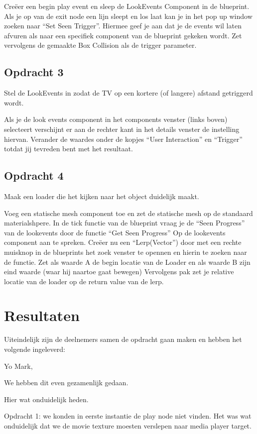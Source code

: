 Creëer een begin play event en sleep de LookEvents Component in de blueprint. Als je op van de exit node een lijn sleept en los laat kan je in het pop up window zoeken naar “Set Seen Trigger”. Hiermee geef je aan dat je de events wil laten afvuren als naar een specifiek component van de blueprint gekeken wordt. Zet vervolgens de gemaakte Box Collision als de trigger parameter.

\subsection{Opdracht 3}
Stel de LookEvents in zodat de TV op een kortere (of langere) afstand getriggerd wordt.

Als je de look events component in het components venster (links boven) selecteert verschijnt er aan de rechter kant in het details venster de instelling hiervan. 
Verander de waardes onder de kopjes “User Interaction” en “Trigger” totdat jij tevreden bent met het resultaat.

\subsection{Opdracht 4}
Maak een loader die het kijken naar het object duidelijk maakt.

Voeg een statische mesh component toe en zet de statische mesh op de standaard materialshpere.
In de tick functie van de blueprint vraag je de “Seen Progress” van de lookevents door de functie “Get Seen Progress” Op de lookevents component aan te spreken.
Creëer nu een “Lerp(Vector”) door met een rechte muisknop in de blueprints het zoek venster te opennen en hierin te zoeken naar de functie.
Zet als waarde A de begin locatie van de Loader en als waarde B zijn eind waarde (waar hij naartoe gaat bewegen)
Vervolgens pak zet je relative locatie  van de loader op de return value van de lerp.

\section{Resultaten}
Uiteindelijk zijn de deelnemers samen de opdracht gaan maken en hebben het volgende ingeleverd:

Yo Mark,

We hebben dit even gezamenlijk gedaan. 

Hier wat onduidelijk heden.

Opdracht 1: we konden in eerste instantie de play node niet vinden.
Het was wat onduidelijk dat we de movie texture moesten verslepen naar media player target.

